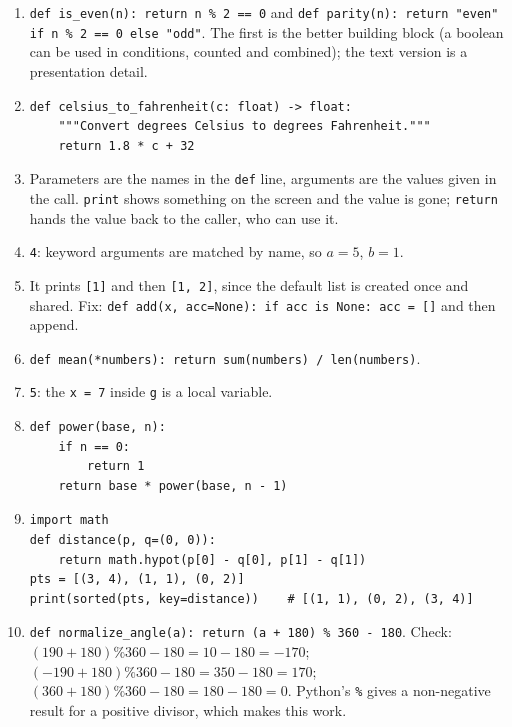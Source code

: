 \begin{enumerate}[label=\textbf{\ansnum.\arabic*}]
  \item \verb!def is_even(n): return n % 2 == 0! and \verb!def parity(n): return "even" if n % 2 == 0 else "odd"!. The first is the better building block (a boolean can be used in conditions, counted and combined); the text version is a presentation detail.
  \item
\begin{verbatim}
def celsius_to_fahrenheit(c: float) -> float:
    """Convert degrees Celsius to degrees Fahrenheit."""
    return 1.8 * c + 32
\end{verbatim}
  \item Parameters are the names in the \texttt{def} line, arguments are the values given in the call. \texttt{print} shows something on the screen and the value is gone; \texttt{return} hands the value back to the caller, who can use it.
  \item \texttt{4}: keyword arguments are matched by name, so $a=5$, $b=1$.
  \item It prints \texttt{[1]} and then \texttt{[1, 2]}, since the default list is created once and shared. Fix: \verb!def add(x, acc=None): if acc is None: acc = []! and then append.
  \item \verb!def mean(*numbers): return sum(numbers) / len(numbers)!.
  \item \texttt{5}: the \texttt{x = 7} inside \texttt{g} is a local variable.
  \item
\begin{verbatim}
def power(base, n):
    if n == 0:
        return 1
    return base * power(base, n - 1)
\end{verbatim}
  \item
\begin{verbatim}
import math
def distance(p, q=(0, 0)):
    return math.hypot(p[0] - q[0], p[1] - q[1])
pts = [(3, 4), (1, 1), (0, 2)]
print(sorted(pts, key=distance))    # [(1, 1), (0, 2), (3, 4)]
\end{verbatim}
  \item[\textbf{\ansnum.10}] \verb!def normalize_angle(a): return (a + 180) % 360 - 180!. Check: $(190+180)\%360-180=10-180=-170$; $(-190+180)\%360-180=350-180=170$; $(360+180)\%360-180=180-180=0$. Python's \texttt{\%} gives a non-negative result for a positive divisor, which makes this work.
\end{enumerate}
